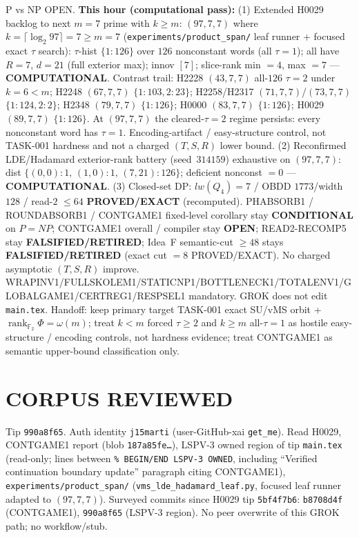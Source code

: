 \documentclass[11pt]{article}
\begin{document}
P vs NP OPEN.
\textbf{This hour (computational pass):}
(1) Extended H0029 backlog to next $m{=}7$ prime with $k{\ge}m$:
$(97,7,7)$ where $k=\lceil\log_2 97\rceil=7{\ge}m{=}7$
(\texttt{experiments/product\_span/} leaf runner + focused exact $\tau$ search):
$\tau$-hist $\{1{:}126\}$ over $126$ nonconstant words (all $\tau{=}1$);
all have $R{=}7$, $d{=}21$ (full exterior max); innov $[7]$;
slice-rank min $=4$, max $=7$ --- \textbf{COMPUTATIONAL}.
Contrast trail: H2228 $(43,7,7)$ all-$126$ $\tau{=}2$ under $k{=}6{<}m$;
H2248 $(67,7,7)$ $\{1{:}103,2{:}23\}$; H2258/H2317 $(71,7,7)$/$(73,7,7)$ $\{1{:}124,2{:}2\}$;
H2348 $(79,7,7)$ $\{1{:}126\}$; H0000 $(83,7,7)$ $\{1{:}126\}$; H0029 $(89,7,7)$ $\{1{:}126\}$.
At $(97,7,7)$ the cleared-$\tau{=}2$ regime persists:
every nonconstant word has $\tau{=}1$. Encoding-artifact / easy-structure control,
not TASK-001 hardness and not a charged $(T,S,R)$ lower bound.
(2) Reconfirmed LDE/Hadamard exterior-rank battery (seed~$314159$) exhaustive on
$(97,7,7)$: dist $\{(0,0){:}1,\,(1,0){:}1,\,(7,21){:}126\}$; deficient nonconst $=0$ ---
\textbf{COMPUTATIONAL}.
(3) Closed-set DP: $lw(Q_4)=7$ / OBDD $1773$/width $128$ / read-$2$ $\le64$
\textbf{PROVED/EXACT} (recomputed).
PHABSORB1 / ROUNDABSORB1 / CONTGAME1 fixed-level corollary stay \textbf{CONDITIONAL} on $P=NP$;
CONTGAME1 overall / compiler stay \textbf{OPEN}; READ2-RECOMP5 stay \textbf{FALSIFIED/RETIRED};
Idea~F semantic-cut $\ge48$ stays \textbf{FALSIFIED/RETIRED} (exact cut $=8$ PROVED/EXACT).
No charged asymptotic $(T,S,R)$ improve.
WRAPINV1/FULLSKOLEM1/STATICNP1/BOTTLENECK1/TOTALENV1/GLOBALGAME1/CERTREG1/RESPSEL1 mandatory.
GROK does not edit \texttt{main.tex}.
Handoff: keep primary target TASK-001 exact SU/vMS orbit + $\operatorname{rank}_{\mathbb F_2}\Phi=\omega(m)$;
treat $k{<}m$ forced $\tau{\ge}2$ and $k{\ge}m$ all-$\tau{=}1$ as hostile easy-structure /
encoding controls, not hardness evidence; treat CONTGAME1 as semantic upper-bound
classification only.

\section*{CORPUS REVIEWED}
Tip \texttt{990a8f65}. Auth identity \texttt{j15marti} (user-GitHub-xai \texttt{get\_me}).
Read H0029, CONTGAME1 report (blob \texttt{187a85fe\ldots}), LSPV-3 owned region of tip
\texttt{main.tex} (read-only; lines between \texttt{\% BEGIN/END LSPV-3 OWNED}, including
``Verified continuation boundary update'' paragraph citing CONTGAME1),
\texttt{experiments/product\_span/} (\texttt{vms\_lde\_hadamard\_leaf.py},
focused leaf runner adapted to $(97,7,7)$).
Surveyed commits since H0029 tip \texttt{5bf4f7b6}:
\texttt{b8708d4f} (CONTGAME1), \texttt{990a8f65} (LSPV-3 region).
No peer overwrite of this GROK path; no workflow/stub.
\end{document}
